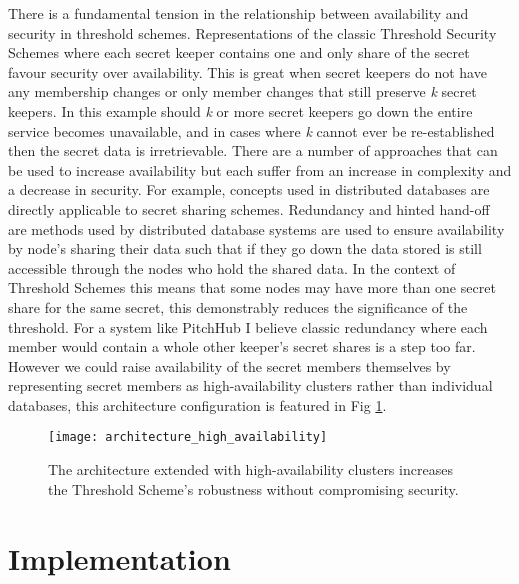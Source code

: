 There is a fundamental tension in the relationship between availability and security in threshold schemes. Representations of the classic Threshold Security Schemes where each secret keeper contains one and only share of the secret favour security over availability. This is great when secret keepers do not have any membership changes or only member changes that still preserve \textit{k} secret keepers. In this example should \textit{k} or more secret keepers go down the entire service becomes unavailable, and in cases where \textit{k} cannot ever be re-established then the secret data is irretrievable. There are a number of approaches that can be used to increase availability but each suffer from an increase in complexity and a decrease in security. For example, concepts used in distributed databases are directly applicable to secret sharing schemes. Redundancy and hinted hand-off are methods used by distributed database systems are used to ensure availability by node's sharing their data such that if they go down the data stored is still accessible through the nodes who hold the shared data. In the context of Threshold Schemes this means that some nodes may have more than one secret share for the same secret, this demonstrably reduces the significance of the threshold. For a system like PitchHub I believe classic redundancy where each member would contain a whole other keeper's secret shares is a step too far. However we could raise availability of the secret members themselves by representing secret members as high-availability clusters rather than individual databases, this architecture configuration is featured in Fig \ref{fig:architecture_high_availability}.

\begin{figure}[ht]
    \centering
    \texttt{[image: architecture\_high\_availability]}
    \caption{The architecture extended with high-availability clusters increases the Threshold Scheme's robustness without compromising security.}
    \label{fig:architecture_high_availability}
\end{figure}

\section{Implementation}

